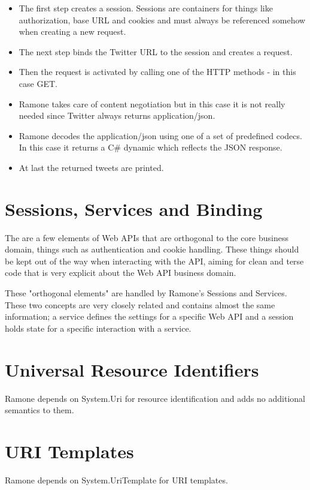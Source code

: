 \begin{itemize}
	\item The first step creates a session. Sessions are containers for
	things like authorization, base URL and cookies and must always be referenced somehow when
	creating a new request.
	
	\item The next step binds the Twitter URL to the session and creates a request.
	
	\item Then the request is activated by calling one of the HTTP methods - in this
	case GET.
	
	\item Ramone takes care of content negotiation but in this case it is not really
	needed since Twitter always returns application/json.
	
	\item Ramone decodes the application/json using one of a set of predefined codecs.
	In this case it returns a C\# dynamic which reflects the JSON response.
	
	\item At last the returned tweets are printed.
\end{itemize}


\section{Sessions, Services and Binding}

The are a few elements of Web APIs that are orthogonal to the core business domain, 
things such as authentication and cookie handling. These things should be kept out of the 
way when interacting with the API, aiming for clean and terse code that is very
explicit about the Web API business domain.

These "orthogonal elements" are handled by Ramone's Sessions and Services. These two
concepts are very closely related and contains almost the same information; a service 
defines the settings for a specific Web API and a session holds state for a specific
interaction with a service.

\section{Universal Resource Identifiers}

Ramone depends on System.Uri for resource identification and adds no additional semantics to them.


\section{URI Templates}

Ramone depends on System.UriTemplate for URI templates. 
